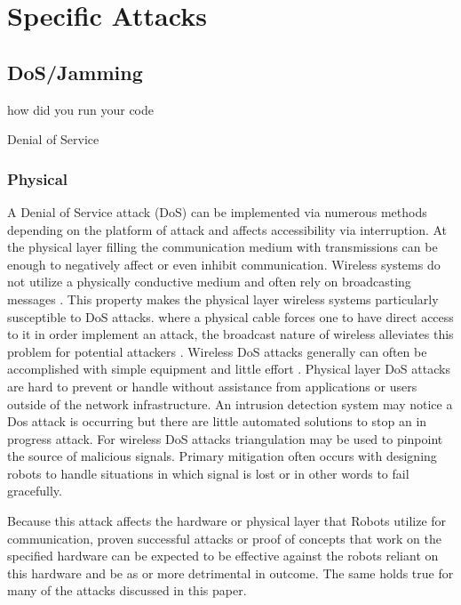 \section{Specific Attacks}
\subsection{DoS/Jamming}how did you run your code

Denial of Service 


\subsubsection{Physical}
A Denial of Service attack (DoS) can be implemented via numerous methods depending on the platform of attack and affects accessibility via interruption. At the physical layer filling the communication medium with transmissions can be enough to negatively affect or even inhibit communication.  Wireless systems do not utilize a physically conductive medium and often rely on broadcasting messages \cite{Cepheli-2013}.  This property makes the physical layer wireless systems particularly susceptible to DoS attacks. where a physical cable forces one to have direct access to it in order implement an attack, the broadcast nature of wireless alleviates this problem for potential attackers \cite{pelechrinis:denial}.  Wireless DoS attacks generally can often be accomplished with simple equipment and little effort \cite{pelechrinis:denial}.  Physical layer DoS attacks are hard to prevent or handle without assistance from applications or users outside of the network infrastructure.  An intrusion detection system may notice a Dos attack is occurring but there are little automated solutions to stop an in progress attack. For wireless DoS attacks triangulation may be used to pinpoint the source of malicious signals. Primary mitigation often occurs with designing robots to handle situations in which signal is lost or in other words to fail gracefully.

Because this attack affects the hardware or physical layer that Robots utilize for communication, proven successful attacks or proof of concepts that work on the specified hardware can be expected to be effective against the robots reliant on this hardware and be as or more detrimental in outcome. The same holds true for many of the attacks discussed in this paper. 

